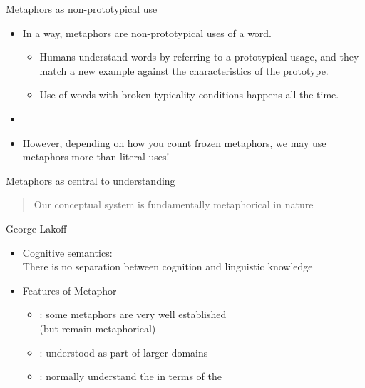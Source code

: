 \begin{frame}{Metaphors as non-prototypical use}

\begin{itemize}
\item In a way, metaphors are non-prototypical uses of a word.
\begin{itemize}
\item Humans understand words by referring to a prototypical usage,
and they match a new example against the characteristics of the
prototype.
\item  Use of words with broken typicality conditions happens all the
time.
\end{itemize}
\item
  \begin{exe}
    \ex {}
    \ex {}
    \ex {}
    \ex {}
    \ex {}
    \ex {}
  \end{exe}
\item However, depending on how you count frozen metaphors, 
we may use metaphors more than literal uses!
\end{itemize}

\end{frame}

\begin{frame}{Metaphors as central to understanding}

\begin{quote}
  \Large Our conceptual system is fundamentally
metaphorical in nature
\end{quote}
\begin{flushright}
  George Lakoff
\end{flushright}

\begin{itemize}
\item Cognitive semantics:
\\ There is no separation between cognition and
linguistic knowledge
\item Features of Metaphor
\begin{itemize}
\item {}: some metaphors are very well established 
\\ (but remain metaphorical)
\item {}: understood as part of larger domains
\item {}: normally understand the  
  in terms of the 
\end{itemize}

\end{itemize}


\end{frame}

